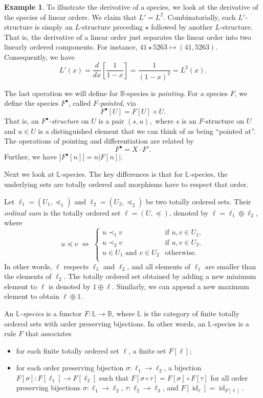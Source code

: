 \documentclass[a4paper, 11pt]{article}
\DeclareMathOperator{\id}{id}
\newcommand{\LL}{\mathbb{L}}
\newcommand{\BB}{\mathbb{B}}
\theoremstyle{definition}
\newtheorem{example}[theorem]{Example}
\begin{document}
\begin{example}
To illustrate the derivative of a species, we look at the derivative
  of the species of linear orders. We claim that $L' =
  L^2$. Combinatorially, each $L'$-structure is simply an $L$-structure
  preceding $\star$ followed by another $L$-structure. That is, the
  derivative of a linear order just separates the linear order into two
  linearly ordered components. For instance, $41 \star 5263 \mapsto (41,5263)$.
  Consequently, we have
  \[ L'(x) 
    = \frac{d}{dx}\left[\frac{1}{1-x}\right]
    = \frac{1}{(1-x)^2} = L^2(x).
  \]
\end{example}

The last operation we will define for $\BB$-species is
\emph{pointing}. For a species $F$, we define the species $F^{\bullet}$,
called \emph{$F$-pointed}, via
\[
  F^{\bullet}[U] = F[U] \times U.
\]
That is, an \emph{$F^{\bullet}$-structure} on $U$ is a pair $(s,u),$
where $s$ is an $F$-structure on $U$ and $u\in U$ is a distinguished
element that we can think of as being ``pointed at''. The operations of
pointing and differentiation are related by
\[
F^\bullet = X \cdot F'.
\]
Further, we have $|F^{\bullet}[n]| = n |F[n]|$.

Next we look at $\LL$-species. The key differences is that for $\LL$-species, the
underlying sets are totally ordered and morphisms have to respect that order. 

Let $\ell_1 = (U_1, \preceq_1)$ and $\ell_2=(U_2,\preceq_2)$ be two totally 
ordered sets. Their \emph{ordinal sum} is the totally
ordered set $\ell=(U, \preceq)$, denoted by $\ell=\ell_1 \oplus \ell_2$, where
\begin{equation*}
  u \preceq v \;\iff\;
  \begin{cases}
    u \prec_1 v  & \text{if } u,v\in U_1, \\
    u \prec_2 v  &  \text{if } u,v\in U_2, \\
    u \in U_1 \text{ and } v\in U_2  & \text{otherwise}. \\
  \end{cases}
\end{equation*}
In other words, $\ell$ respects $\ell_1$ and $\ell_2$, and all elements of $\ell_1$
are smaller than the elements of $\ell_2$. The totally ordered set obtained
by adding a new minimum element to $\ell$ is denoted
by $1 \oplus \ell$. Similarly, we can append a new maximum element to obtain 
$\ell \oplus 1$.

An \emph{$\LL$-species} is a functor $F:\LL\to\BB$, where $\LL$ is the category
of finite totally ordered sets with order preserving bijections. In other words,
an $\LL$-species is a rule $F$ that associates
\begin{itemize}
\item for each finite totally ordered set $\ell$, a finite set $F[\ell]$;
\item for each order preserving bijection $\sigma: \ell_1 \to \ell_2$, a
  bijection $F[\sigma]: F[\ell_1] \to F[\ell_2]$ such that
  $F[\sigma \circ \tau] = F[\sigma] \circ F[\tau]$ for all order
  preserving bijections $\sigma: \ell_1 \rightarrow \ell_2$,
  $\tau: \ell_2 \rightarrow \ell_3$, and $F[\id_{\ell}]=\id_{F[\ell]}$.
\end{itemize}
\end{document}

